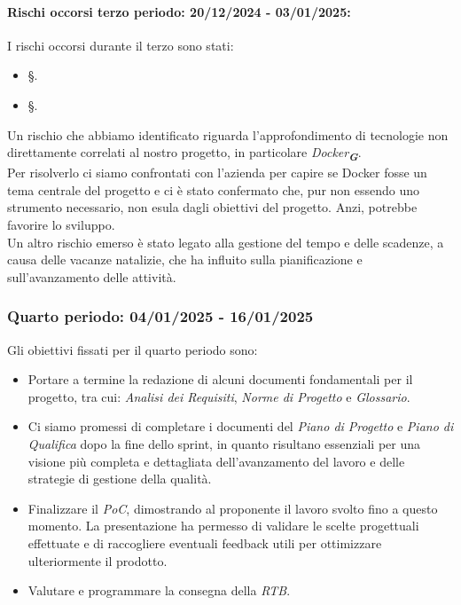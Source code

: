 \paragraph{Rischi occorsi terzo periodo: 20/12/2024 - 03/01/2025: }
I rischi occorsi durante il terzo sono stati:
\begin{itemize}
    \item \S{}.
    \item \S{}.
\end{itemize}
Un rischio che abbiamo identificato riguarda l'approfondimento di tecnologie non direttamente correlati al nostro progetto, in particolare {\emph{Docker}}\textsubscript{\textit{\textbf{G}}}.\\
Per risolverlo ci siamo confrontati con l'azienda per capire se Docker fosse un tema centrale del progetto e ci è stato confermato che, pur non essendo uno strumento necessario, non esula dagli obiettivi del progetto. Anzi, potrebbe favorire lo sviluppo.\\
Un altro rischio emerso è stato legato alla gestione del tempo e delle scadenze, a causa delle vacanze natalizie, che ha influito sulla pianificazione e sull’avanzamento delle attività.

\newpage
\subsubsection{Quarto periodo: 04/01/2025 - 16/01/2025}  
\label{sec:prev_cons_quarto_periodo}  

Gli obiettivi fissati per il quarto periodo sono:  
\begin{itemize} 
    \item Portare a termine la redazione di alcuni documenti fondamentali per il progetto, tra cui: \emph{Analisi dei Requisiti}, \emph{Norme di Progetto} e \emph{Glossario}. 
    \item Ci siamo promessi di completare i documenti del \emph{Piano di Progetto} e \emph{Piano di Qualifica} dopo la fine dello sprint, in quanto risultano essenziali per una visione più completa e dettagliata dell'avanzamento del lavoro e delle strategie di gestione della qualità.  
    \item Finalizzare il \emph{PoC}, dimostrando al proponente il lavoro svolto fino a questo momento. La presentazione ha permesso di validare le scelte progettuali effettuate e di raccogliere eventuali feedback utili per ottimizzare ulteriormente il prodotto.  
    \item Valutare e programmare la consegna della \emph{RTB}.  
\end{itemize} 

